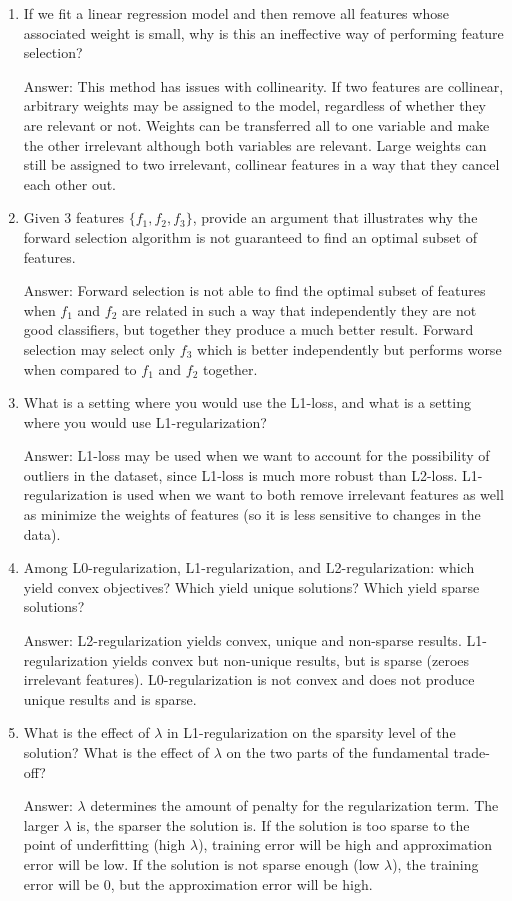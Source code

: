 \documentclass{article}
\def\ans#1{\par\gre{Answer: #1}}
\def\gre#1{{\color{gre}#1}}
\def\enum#1{\begin{enumerate}#1\end{enumerate}}
\begin{document}
\enum{
\item If we fit a linear regression model and then remove all features whose associated weight is small, why is this an ineffective way of performing feature selection?
\ans{This method has issues with collinearity. If two features are collinear, arbitrary weights may be assigned to the model, regardless of whether they are relevant or not. Weights can be transferred all to one variable and make the other irrelevant although both variables are relevant. Large weights can still be assigned to two irrelevant, collinear features in a way that they cancel each other out.}
\item Given $3$ features $\{f_1, f_2, f_3\}$, provide an argument that illustrates why the forward selection algorithm is not guaranteed to find an optimal subset of features.
\ans{Forward selection is not able to find the optimal subset of features when $f_1$ and $f_2$ are related in such a way that independently they are not good classifiers, but together they produce a much better result. Forward selection may select only $f_3$ which is better independently but performs worse when compared to $f_1$ and $f_2$ together.}
\item What is a setting where you would use the L1-loss, and what is a setting where you would use L1-regularization?
\ans{L1-loss may be used when we want to account for the possibility of outliers in the dataset, since L1-loss is much more robust than L2-loss. L1-regularization is used when we want to both remove irrelevant features as well as minimize the weights of features (so it is less sensitive to changes in the data).}
\item Among L0-regularization, L1-regularization, and L2-regularization: which yield convex objectives? Which yield unique solutions? Which yield sparse solutions?
\ans{L2-regularization yields convex, unique and non-sparse results. L1-regularization yields convex but non-unique results, but is sparse (zeroes irrelevant features). L0-regularization is not convex and does not produce unique results and is sparse.}
\item What is the effect of $\lambda$ in L1-regularization on the sparsity level of the solution? What is the effect of $\lambda$ on the two parts of the fundamental trade-off?
\ans{$\lambda$ determines the amount of penalty for the regularization term. The larger $\lambda$ is, the sparser the solution is. If the solution is too sparse to the point of underfitting (high $\lambda$), training error will be high and approximation error will be low. If the solution is not sparse enough (low $\lambda$), the training error will be 0, but the approximation error will be high.}
}
\end{document}
